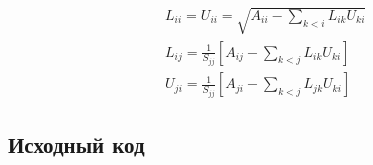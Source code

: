 \documentclass[12pt, a4paper]{article}
\begin{document}
\begin{align}
  &L_{ii} = U_{ii} = \sqrt{A_{ii} - \sum_{k < i}L_{ik}U_{ki}} \\[1ex]
  &L_{ij} = \frac{1}{S_{jj}} \left[ A_{ij} - \sum_{k < j}L_{ik}U_{ki} \right] \\[1ex]
  &U_{ji} = \frac{1}{S_{jj}} \left[ A_{ji} - \sum_{k < j}L_{jk}U_{ki} \right]
\end{align}

\subsection{Исходный код}

\inputminted[firstline=104, lastline=170]{c}{/home/mehandes/c/src/github.com/meha4j/math/vec/mtx/src/mtx_csj.c}
\end{document}
